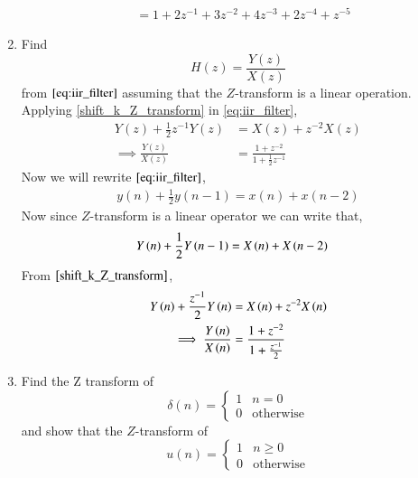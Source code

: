 \documentclass[journal,12pt,twocolumn]{IEEEtran}
\renewcommand\thesection{\arabic{section}}
\begin{document}
\begin{enumerate}[label=\thesection.\arabic*]
\begin{align}
                                   &= 1 + 2z^{-1} + 3z^{-2} + 4z^{-3} + 2z^{-4} + z^{-5} 
    \end{align}
   \item Find
   \begin{equation}
   H(z) = \frac{Y(z)}{X(z)}
   \end{equation}
   from  $\eqref{eq:iir_filter}$ assuming that the $Z$-transform is a linear operation.
   \\
   \solution Applying \eqref{shift_k_Z_transform} in \eqref{eq:iir_filter},
   \begin{align}
   Y(z) + \frac{1}{2}z^{-1}Y(z) &= X(z)+z^{-2}X(z)
   \\
   \implies \frac{Y(z)}{X(z)} &= \frac{1 + z^{-2}}{1 + \frac{1}{2}z^{-1}}
   \label{eq:freq_resp}
   \end{align}
    \solution 
     Now we will rewrite $\eqref{eq:iir_filter}$,
      \begin{align}
          y(n) + \frac{1}{2}y(n-1) = x(n) + x(n-2)
      \end{align}
     Now since $Z$-transform is a linear operator we can write that,
      \begin{align}
          Y\left(n\right) + \frac{1}{2}Y\left(n-1\right) &= X\left(n\right) + X\left(n-2\right)
      \end{align}
      From $\eqref{shift_k_Z_transform}$,
      \begin{align}
          Y\left(n\right) + \frac{z^{-1}}{2}Y\left(n\right) &= X\left(n\right) + z^{-2}X\left(n\right)\\
       \implies \frac{Y\left(n\right)}{X\left(n\right)} &= \frac{1 + z^{-2}}{1 + \frac{z^{-1}}{2}} 
      \end{align}       
      \item Find the Z transform of 
      \begin{equation}
      \label{delta}
      \delta(n)
      =
      \begin{cases}
      1 & n = 0
      \\
      0 & \text{otherwise}
      \end{cases}
      \end{equation}
      and show that the $Z$-transform of
      \begin{equation}
      \label{eq:unit_step}
      u(n)
      =
      \begin{cases}
      1 & n \ge 0
      \\
      0 & \text{otherwise}
      \end{cases}
      \end{equation}

\end{enumerate}
\end{document}
